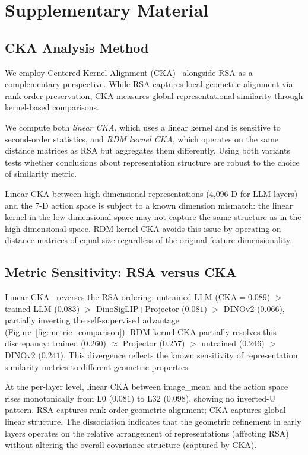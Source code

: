 \appendix

\section{Supplementary Material}
\label{sec:appendix}

\subsection{CKA Analysis Method}
\label{sec:cka_appendix}

We employ Centered Kernel Alignment (CKA)~\cite{kornblith2019} alongside RSA as a complementary perspective.
While RSA captures local geometric alignment via rank-order preservation, CKA measures global representational similarity through kernel-based comparisons.

We compute both \emph{linear CKA}, which uses a linear kernel and is sensitive to second-order statistics, and \emph{RDM kernel CKA}, which operates on the same distance matrices as RSA but aggregates them differently.
Using both variants tests whether conclusions about representation structure are robust to the choice of similarity metric.

Linear CKA between high-dimensional representations (4{,}096-D for LLM layers) and the 7-D action space is subject to a known dimension mismatch: the linear kernel in the low-dimensional space may not capture the same structure as in the high-dimensional space.
RDM kernel CKA avoids this issue by operating on distance matrices of equal size regardless of the original feature dimensionality.

\subsection{Metric Sensitivity: RSA versus CKA}
\label{sec:metric_sensitivity_appendix}

Linear CKA~\cite{kornblith2019} reverses the RSA ordering: untrained LLM ($\text{CKA} = 0.089$) $>$ trained LLM ($0.083$) $>$ DinoSigLIP+Projector ($0.081$) $>$ DINOv2 ($0.066$), partially inverting the self-supervised advantage (Figure~\ref{fig:metric_comparison}).
RDM kernel CKA partially resolves this discrepancy: trained ($0.260$) $\approx$ Projector ($0.257$) $>$ untrained ($0.246$) $>$ DINOv2 ($0.241$).
This divergence reflects the known sensitivity of representation similarity metrics to different geometric properties.

At the per-layer level, linear CKA between image\_mean and the action space rises monotonically from L0 ($0.081$) to L32 ($0.098$), showing no inverted-U pattern.
RSA captures rank-order geometric alignment; CKA captures global linear structure.
The dissociation indicates that the geometric refinement in early layers operates on the relative arrangement of representations (affecting RSA) without altering the overall covariance structure (captured by CKA).


